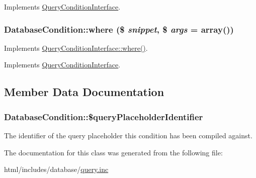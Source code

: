Implements \hyperlink{interfaceQueryConditionInterface_a8aae11796846850edbf8caa3a9d4afcd}{QueryConditionInterface}.\hypertarget{classDatabaseCondition_ade864c6825d48205a1a6ec6fb1c3076f}{
\subsubsection[{where}]{\setlength{\rightskip}{0pt plus 5cm}DatabaseCondition::where (\$ {\em snippet}, \/  \$ {\em args} = {\ttfamily array()})}}
\label{classDatabaseCondition_ade864c6825d48205a1a6ec6fb1c3076f}
Implements \hyperlink{interfaceQueryConditionInterface_a42c03c74dd81ef6d77041e67ec12e735}{QueryConditionInterface::where()}. 

Implements \hyperlink{interfaceQueryConditionInterface_a42c03c74dd81ef6d77041e67ec12e735}{QueryConditionInterface}.

\subsection{Member Data Documentation}
\hypertarget{classDatabaseCondition_a282f36ef640252385cb9e1d7872151b1}{
\subsubsection[{\$queryPlaceholderIdentifier}]{\setlength{\rightskip}{0pt plus 5cm}DatabaseCondition::\$queryPlaceholderIdentifier}}
\label{classDatabaseCondition_a282f36ef640252385cb9e1d7872151b1}
The identifier of the query placeholder this condition has been compiled against. 

The documentation for this class was generated from the following file:\begin{DoxyCompactItemize}
\item 
html/includes/database/\hyperlink{query_8inc}{query.inc}\end{DoxyCompactItemize}
